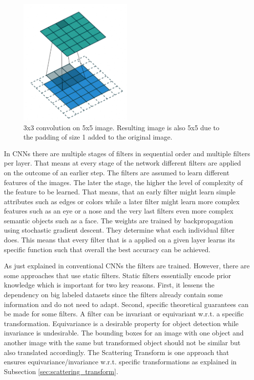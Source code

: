  \begin{figure}[!htb]
    	\centering
    	\includegraphics[width=0.5\textwidth]{images/convolution.png}
    	\caption{3x3 convolution on 5x5 image. Resulting image is also 5x5 due to the padding of size 1 added to the original image. \protect\footnotemark}
    	\label{fig:convolution}
 \end{figure}
 
 
 In CNNs there are multiple stages of filters in sequential order and multiple filters per layer. That means at every stage of the network different filters are applied on the outcome of an earlier step. The filters are assumed to learn different features of the images. The later the stage, the higher the level of complexity of the feature to be learned. That means, that an early filter might learn simple attributes such as edges or colors while a later filter might learn more complex features such as an eye or a nose and the very last filters even more complex semantic objects such as a face. The weights are trained by backpropagation using stochastic gradient descent. They determine what each individual filter does. This means that every filter that is a applied on a given layer learns its specific function such that overall the best accuracy can be achieved. 
 
 As just explained in conventional CNNs the filters are trained. However, there are some approaches that use static filters. Static filters essentially encode prior knowledge which is important for two key reasons. First, it lessens the dependency on big labeled datasets since the filters already contain some information and do not need to adapt. Second, specific theoretical guarantees can be made for some filters. A filter can be invariant or equivariant w.r.t. a specific transformation. Equivariance is a desirable property for object detection while invariance is undesirable. The bounding boxes for an image with one object and another image with the same but transformed object should not be similar but also translated accordingly.
 The Scattering Transform is one approach that ensures equivariance/invariance w.r.t. specific transformations as explained in Subsection \ref{sec:scattering_transform}. 


